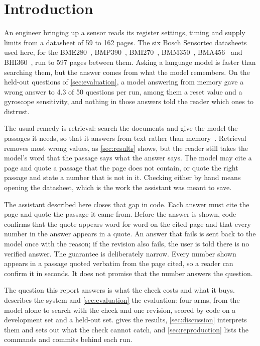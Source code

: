 \section{Introduction}
\label{sec:introduction}

An engineer bringing up a sensor reads its register settings, timing and supply limits from a datasheet of 59 to 162 pages. The six Bosch Sensortec datasheets used here, for the BME280~\cite{bme280}, BMP390~\cite{bmp390}, BMI270~\cite{bmi270}, BMM350~\cite{bmm350}, BMA456~\cite{bma456} and BHI360~\cite{bhi360}, run to 597 pages between them. Asking a language model is faster than searching them, but the answer comes from what the model remembers. On the held-out questions of \cref{sec:evaluation}, a model answering from memory gave a wrong answer to 4.3 of 50 questions per run, among them a reset value and a gyroscope sensitivity, and nothing in those answers told the reader which ones to distrust.

The usual remedy is retrieval: search the documents and give the model the passages it needs, so that it answers from text rather than memory~\cite{lewis2020}. Retrieval removes most wrong values, as \cref{sec:results} shows, but the reader still takes the model's word that the passage says what the answer says. The model may cite a page and quote a passage that the page does not contain, or quote the right passage and state a number that is not in it. Checking either by hand means opening the datasheet, which is the work the assistant was meant to save.

The assistant described here closes that gap in code. Each answer must cite the page and quote the passage it came from. Before the answer is shown, code confirms that the quote appears word for word on the cited page and that every number in the answer appears in a quote. An answer that fails is sent back to the model once with the reason; if the revision also fails, the user is told there is no verified answer. The guarantee is deliberately narrow. Every number shown appears in a passage quoted verbatim from the page cited, so a reader can confirm it in seconds. It does not promise that the number answers the question.

The question this report answers is what the check costs and what it buys.  describes the system and \cref{sec:evaluation} the evaluation: four arms, from the model alone to search with the check and one revision, scored by code on a development set and a held-out set.  gives the results, \cref{sec:discussion} interprets them and sets out what the check cannot catch, and \cref{sec:reproduction} lists the commands and commits behind each run.
